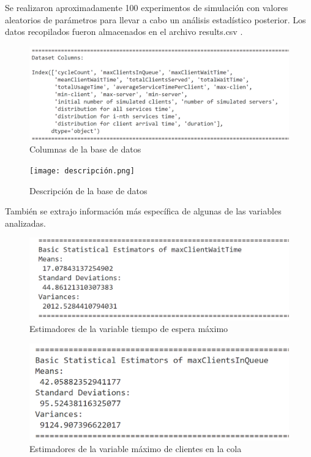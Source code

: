 \documentclass[12pt]{article}
\begin{document}
 Se realizaron aproximadamente 100 experimentos de simulación con valores aleatorios de parámetros para llevar a cabo un análisis estadístico posterior. Los datos recopilados fueron almacenados en el archivo results.csv .

\begin{figure}[H]
\centering
\includegraphics[width=1.2\textwidth]{columnas.png}
\caption{Columnas de la base de datos}
\end{figure}

\begin{figure}[H]
\centering
\texttt{[image: descripción.png]}
\caption{Descripción de la base de datos}
\end{figure}

 También se extrajo información más específica de algunas de las variables analizadas.

\begin{figure}[H]
\centering
\includegraphics[width=1.2\textwidth]{tiempo de espera estimadores.png}
\caption{Estimadores de la variable tiempo de espera máximo}
\end{figure}

\begin{figure}[H]
\centering
\includegraphics[width=1.2\textwidth]{maximo de clientes en la cola estimadores.png}
\caption{Estimadores de la variable máximo de clientes en la cola}
\end{figure}
\end{document}
